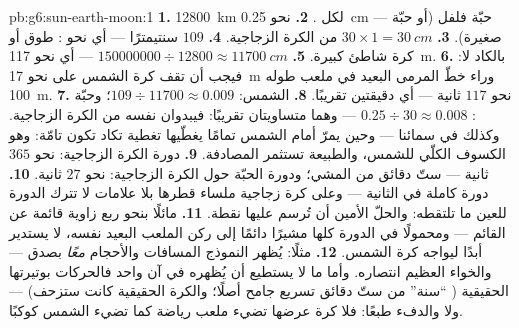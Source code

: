 \begin{solution}{pb:g6:sun-earth-moon:1}
\textbf{1.} \qty{12800}{km} لكل .
\textbf{2.} نحو \qty{0.25}{cm} --- حبّة فلفل (أو حبّة صغيرة).
\textbf{3.} $30 \times 1 = \qty{30}{cm}$ من الكرة الزجاجية.
\textbf{4.} $109$ سنتيمترًا --- أي نحو : طوق أو كرة شاطئ
كبيرة.
\textbf{5.} $150000000 \div 12800 \approx \qty{11700}{cm}$ ---
أي نحو \qty{117}{m}.
\textbf{6.} بالكاد لا: فيجب أن تقف كرة الشمس على نحو \qty{17}{m}
وراء خطّ المرمى البعيد في ملعب طوله \qty{100}{m}.
\textbf{7.} نحو $117$ ثانية --- أي دقيقتين تقريبًا.
\textbf{8.} الشمس: $109 \div 11700 \approx 0.009$؛ وحبّة :
$0.25 \div 30 \approx 0.008$ --- وهما متساويتان تقريبًا:
فيبدوان  نفسه من الكرة الزجاجية. وكذلك في سمائنا --- وحين
يمرّ  أمام الشمس تمامًا يغطّيها تغطية تكاد تكون تامّة:
وهو الكسوف الكلّي للشمس، والطبيعة تستثمر المصادفة.
\textbf{9.} دورة الكرة الزجاجية: نحو $365$ ثانية --- ستّ دقائق
من المشي؛ ودورة الحبّة حول الكرة الزجاجية: نحو $27$ ثانية.
\textbf{10.} دورة كاملة في الثانية --- وعلى كرة زجاجية ملساء
قطرها  بلا علامات لا تترك الدورة للعين ما تلتقطه:
والحلّ الأمين أن تُرسم عليها نقطة.
\textbf{11.} مائلًا بنحو ربع زاوية قائمة عن القائم --- ومحمولًا
في الدورة كلها مشيرًا دائمًا إلى ركن الملعب البعيد نفسه، لا
يستدير أبدًا ليواجه كرة الشمس.
\textbf{12.} مثلًا: يُظهر النموذج المسافات والأحجام \emph{معًا}
بصدق --- والخواء العظيم انتصاره. وأما ما لا يستطيع أن يُظهره في
آن واحد فالحركات بوتيرتها الحقيقية ( ``سنة'' من ستّ دقائق
تسريع جامح أصلًا؛ والكرة الحقيقية كانت ستزحف) --- ولا 
والدفء طبعًا: فلا كرة عرضها  تضيء ملعب رياضة كما تضيء الشمس
كوكبًا.
\end{solution}
